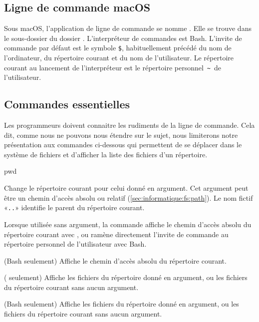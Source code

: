 \subsection{Ligne de commande macOS}
\label{sec:informatique:cli:macos}

Sous macOS, l'application de ligne de commande se nomme
. Elle se trouve dans le sous-dossier
 du dossier . L'interpréteur de
commandes est Bash. L'invite de commande par défaut est le
symbole \verb=$=, habituellement précédé du nom de l'ordinateur, du
répertoire courant et du nom de l'utilisateur. Le répertoire courant
au lancement de l'interpréteur est le répertoire personnel
\,\verb=~=\, de l'utilisateur.

\subsection{Commandes essentielles}
\label{sec:informatique:cli:commandes}

Les programmeurs doivent connaitre les rudiments de la ligne de
commande. Cela dit, comme nous ne pouvons nous étendre sur le sujet,
nous limiterons notre présentation aux commandes ci-dessous qui
permettent de se déplacer dans le système de fichiers et d'afficher
la liste des fichiers d'un répertoire.

\begin{ttscript}{pwd}
\item[\code{cd}]  Change le répertoire courant pour
  celui donné en argument. Cet argument peut être un chemin d'accès
  absolu ou relatif (\autoref{sec:informatique:fs:path}). Le nom
  fictif «\verb=..=» identifie le parent du répertoire courant.

  Lorsque utilisée sans argument, la commande affiche le chemin
  d'accès absolu du répertoire courant avec , ou ramène
  directement l'invite de commande au répertoire personnel de
  l'utilisateur avec Bash.
\item[\code{pwd}]  (Bash seulement) Affiche le
  chemin d'accès absolu du répertoire courant.
\item[\code{dir}] 
  ( seulement) Affiche les
  fichiers du répertoire donné en argument, ou les fichiers du
  répertoire courant sans aucun argument.
\item[\code{ls}]  (Bash seulement) Affiche les
  fichiers du répertoire donné en argument, ou les fichiers du
  répertoire courant sans aucun argument.
\end{ttscript}


